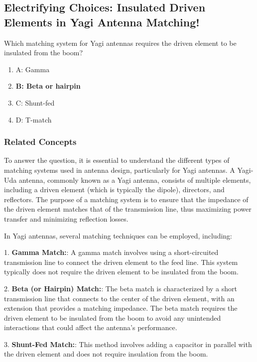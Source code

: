 \subsection{Electrifying Choices: Insulated Driven Elements in Yagi Antenna Matching!}

\begin{tcolorbox}[colback=gray!10, colframe=black, title=E9E01] 

Which matching system for Yagi antennas requires the driven element to be insulated from the boom?
\begin{enumerate}
    \item A: Gamma
    \item \textbf{B: Beta or hairpin}
    \item C: Shunt-fed
    \item D: T-match
\end{enumerate} \end{tcolorbox}

\subsubsection{Related Concepts}

To answer the question, it is essential to understand the different types of matching systems used in antenna design, particularly for Yagi antennas. A Yagi-Uda antenna, commonly known as a Yagi antenna, consists of multiple elements, including a driven element (which is typically the dipole), directors, and reflectors. The purpose of a matching system is to ensure that the impedance of the driven element matches that of the transmission line, thus maximizing power transfer and minimizing reflection losses.

In Yagi antennas, several matching techniques can be employed, including:

1. \textbf{Gamma Match:}: A gamma match involves using a short-circuited transmission line to connect the driven element to the feed line. This system typically does not require the driven element to be insulated from the boom.

2. \textbf{Beta (or Hairpin) Match:}: The beta match is characterized by a short transmission line that connects to the center of the driven element, with an extension that provides a matching impedance. The beta match requires the driven element to be insulated from the boom to avoid any unintended interactions that could affect the antenna's performance.

3. \textbf{Shunt-Fed Match:}: This method involves adding a capacitor in parallel with the driven element and does not require insulation from the boom.


